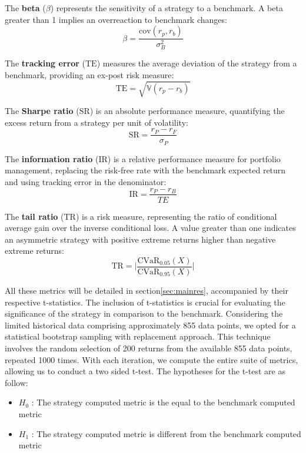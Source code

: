 \documentclass{article}
\begin{document}
The \textbf{beta} (\(\beta\)) represents the sensitivity of a strategy to a benchmark. A beta greater than 1 implies an overreaction to benchmark changes:
    \[\beta = \frac{\text{cov}(r_p,r_b)}{\sigma_B^2}\]

The \textbf{tracking error} (\(\text{TE}\)) measures the average deviation of the strategy from a benchmark, providing an ex-post risk measure:
    \[\text{TE}=\sqrt{\mathbb{V}(r_p-r_b)}\]

The \textbf{Sharpe ratio} (\(\text{SR}\)) is an absolute performance measure, quantifying the excess return from a strategy per unit of volatility:
    \[\text{SR} = \frac{r_P-r_F}{\sigma_P}\]

The \textbf{information ratio} (\(\text{IR}\)) is a relative performance measure for portfolio management, replacing the risk-free rate with the benchmark expected return and using tracking error in the denominator:
    \[\text{IR} = \frac{r_P-r_B}{TE}\]

The \textbf{tail ratio} (\(\text{TR}\)) is a risk measure, representing the ratio of conditional average gain over the inverse conditional loss. A value greater than one indicates an asymmetric strategy with positive extreme returns higher than negative extreme returns:
    \[\text{TR}=\vert\frac{\text{CVaR}_{0.05}(X)}{\text{CVaR}_{0.95}(X)}\vert\]


All these metrics will be detailed in section\ref{sec:mainres}, accompanied by their respective t-statistics. The inclusion of t-statistics is crucial for evaluating the significance of the strategy in comparison to the benchmark. Considering the limited historical data comprising approximately 855 data points, we opted for a statistical bootstrap sampling with replacement approach. This technique involves the random selection of 200 returns from the available 855 data points, repeated 1000 times. With each iteration, we compute the entire suite of metrics, allowing us to conduct a two sided t-test. The hypotheses for the t-test are as follow:
\begin{itemize}
    \item $H_0$ : The strategy computed metric is the equal to the benchmark computed metric
    \item $H_1$ : The strategy computed metric is different from the benchmark computed metric
\end{itemize}
\end{document}
